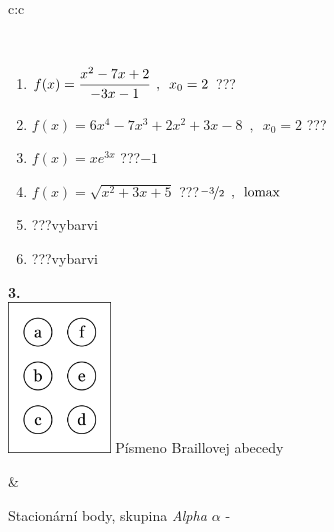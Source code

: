 \documentclass[10pt]{report}
\begin{document}
\begin{tabular}{c:c}
\begin{minipage}[c][104.5mm][t]{0.5\linewidth}
\begin{center}
\begin{minipage}{0.95\linewidth}
\begin{center}
\end{center}
\end{minipage}
\\[1mm]
\begin{minipage}{0.79\linewidth}
\begin{center}
\begin{varwidth}{\linewidth}
\begin{enumerate}
\normalsize
\item $f(x)=\cfrac{x^2-7x+2}{-3x-1}\enspace , \enspace x_0=2$\quad \dotfill\; ???\;\dotfill \quad {}
\item $f(x)=6x^4-7x^3+2x^2+3x-8\enspace , \enspace x_0=2$\quad \dotfill\; ???\;\dotfill \quad {}
\item $f(x)=xe^{3x}$\quad \dotfill\; ???\;\dotfill \quad $-1$
\item $f(x)=\sqrt{x^2+3x+5}$\quad \dotfill\; ???\;\dotfill \quad $\nicefrac{-3}{2}\enspace , \enspace\mathrm{lomax}$
\item \quad \dotfill\; ???\;\dotfill \quad vybarvi
\item \quad \dotfill\; ???\;\dotfill \quad vybarvi
\end{enumerate}
\end{varwidth}
\end{center}
\end{minipage}
\begin{minipage}{0.20\linewidth}
\begin{center}
{\Huge\bfseries 3.} \\[2mm]
\includegraphics[height=40mm]{../images/braille.png}
{\small Písmeno Braillovej abecedy}
\end{center}
\end{minipage}
\end{center}
\end{minipage}
&
\begin{minipage}[c][104.5mm][t]{0.5\linewidth}
\begin{center}
\vspace{7mm}
{\huge Stacionární body, skupina \textit{Alpha $\alpha$} -}\\[5mm]

\end{center}
\end{minipage}
\end{tabular}
\end{document}
